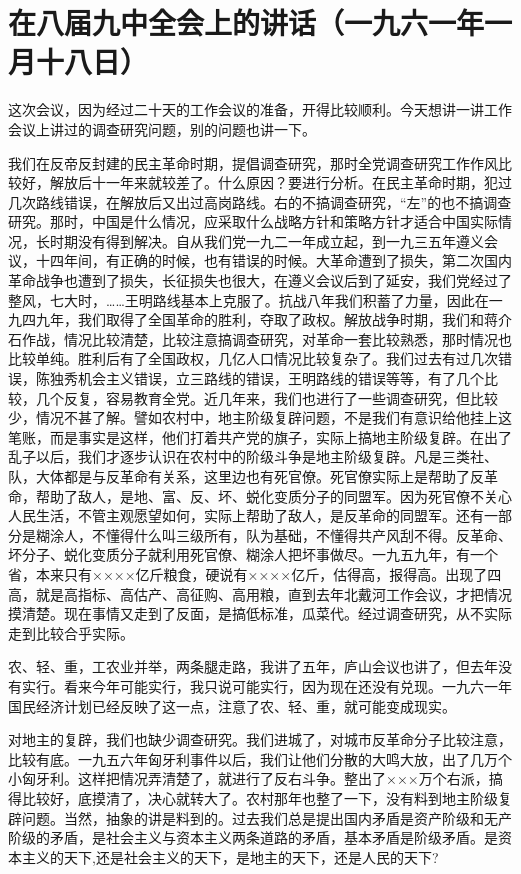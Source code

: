 \section{在八届九中全会上的讲话（一九六一年一月十八日）}


这次会议，因为经过二十天的工作会议的准备，开得比较顺利。今天想讲一讲工作会议上讲过的调查研究问题，别的问题也讲一下。

我们在反帝反封建的民主革命时期，提倡调查研究，那时全党调查研究工作作风比较好，解放后十一年来就较差了。什么原因？要进行分析。在民主革命时期，犯过几次路线错误，在解放后又出过高岗路线。右的不搞调查研究，“左”的也不搞调查研究。那时，中国是什么情况，应采取什么战略方针和策略方针才适合中国实际情况，长时期没有得到解决。自从我们党一九二一年成立起，到一九三五年遵义会议，十四年间，有正确的时候，也有错误的时候。大革命遭到了损失，第二次国内革命战争也遭到了损失，长征损失也很大，在遵义会议后到了延安，我们党经过了整风，七大时，……王明路线基本上克服了。抗战八年我们积蓄了力量，因此在一九四九年，我们取得了全国革命的胜利，夺取了政权。解放战争时期，我们和蒋介石作战，情况比较清楚，比较注意搞调查研究，对革命一套比较熟悉，那时情况也比较单纯。胜利后有了全国政权，几亿人口情况比较复杂了。我们过去有过几次错误，陈独秀机会主义错误，立三路线的错误，王明路线的错误等等，有了几个比较，几个反复，容易教育全党。近几年来，我们也进行了一些调查研究，但比较少，情况不甚了解。譬如农村中，地主阶级复辟问题，不是我们有意识给他挂上这笔账，而是事实是这样，他们打着共产党的旗子，实际上搞地主阶级复辟。在出了乱子以后，我们才逐步认识在农村中的阶级斗争是地主阶级复辟。凡是三类社、队，大体都是与反革命有关系，这里边也有死官僚。死官僚实际上是帮助了反革命，帮助了敌人，是地、富、反、坏、蜕化变质分子的同盟军。因为死官僚不关心人民生活，不管主观愿望如何，实际上帮助了敌人，是反革命的同盟军。还有一部分是糊涂人，不懂得什么叫三级所有，队为基础，不懂得共产风刮不得。反革命、坏分子、蜕化变质分子就利用死官僚、糊涂人把坏事做尽。一九五九年，有一个省，本来只有××××亿斤粮食，硬说有××××亿斤，估得高，报得高。出现了四高，就是高指标、高估产、高征购、高用粮，直到去年北戴河工作会议，才把情况摸清楚。现在事情又走到了反面，是搞低标准，瓜菜代。经过调查研究，从不实际走到比较合乎实际。

农、轻、重，工农业并举，两条腿走路，我讲了五年，庐山会议也讲了，但去年没有实行。看来今年可能实行，我只说可能实行，因为现在还没有兑现。一九六一年国民经济计划已经反映了这一点，注意了农、轻、重，就可能变成现实。

对地主的复辟，我们也缺少调查研究。我们进城了，对城市反革命分子比较注意，比较有底。一九五六年匈牙利事件以后，我们让他们分散的大鸣大放，出了几万个小匈牙利。这样把情况弄清楚了，就进行了反右斗争。整出了×××万个右派，搞得比较好，底摸清了，决心就转大了。农村那年也整了一下，没有料到地主阶级复辟问题。当然，抽象的讲是料到的。过去我们总是提出国内矛盾是资产阶级和无产阶级的矛盾，是社会主义与资本主义两条道路的矛盾，基本矛盾是阶级矛盾。是资本主义的天下,还是社会主义的天下，是地主的天下，还是人民的天下?


